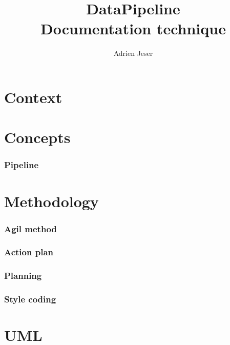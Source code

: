 \documentclass{article}
\title{DataPipeline \\ Documentation technique}
\author{Adrien Jeser}
\begin{document}
\maketitle
\newpage
\tableofcontents
\newpage

\section{Context}
\label{sec:context}


\section{Concepts}
\label{sec:concepts}

\subsubsection{Pipeline}
\label{ssub:pipeline}

\section{Methodology}
\label{sec:methodology}

\subsubsection{Agil method}
\label{ssub:agil_method}

\subsubsection{Action plan}
\label{ssub:Action plan}

\subsubsection{Planning}
\label{ssub:planning}

\subsubsection{Style coding}
\label{ssub:style_coding}

\section{UML}
\label{sec:uml}
\end{document}
